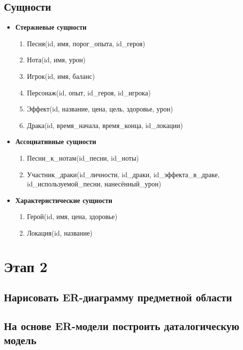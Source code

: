 \subsection*{Сущности}


\begin{itemize}
\item \textbf{Стержневые сущности}
\begin{enumerate}
    \item Песня(id, имя, порог\_опыта, id\_героя)
    \item Нота(id, имя, урон)
    \item Игрок(id, имя, баланс)
    \item Персонаж(id, опыт, id\_героя, id\_игрока)
    \item Эффект(id, название, цена, цель, здоровье, урон)
    \item Драка(id, время\_начала, время\_конца, id\_локации)
\end{enumerate}

\item \textbf{Ассоциативные сущности}
\begin{enumerate}
    \item Песни\_к\_нотам(id\_песни, id\_ноты)
    \item Участник\_драки(id\_личности, id\_драки, id\_эффекта\_в\_драке, id\_используемой\_песни, нанесённый\_урон)
\end{enumerate}

\item \textbf{Характеристические сущности}
\begin{enumerate}
    \item Герой(id, имя, цена, здоровье)
    \item Локация(id, название)
\end{enumerate}
\end{itemize}

\section*{Этап 2}


\subsection*{Нарисовать ER-диаграмму предметной области}



\subsection*{На основе ER-модели построить даталогическую модель}


